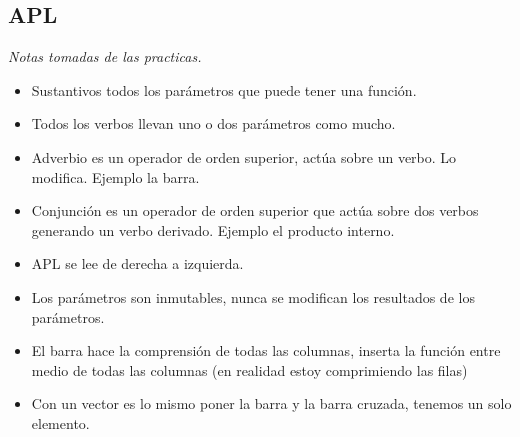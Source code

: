\subsection{APL}
\textit{Notas tomadas de las practicas.}

\begin{itemize}
\item Sustantivos todos los parámetros que puede tener una función.
\item Todos los verbos llevan uno o dos parámetros como mucho.
\item Adverbio es un operador de orden superior, actúa sobre un verbo. Lo modifica. Ejemplo la barra.
\item Conjunción es un operador de orden superior que actúa sobre dos verbos generando un verbo derivado. Ejemplo el producto interno.
\item APL se lee de derecha a izquierda.
\item Los parámetros son inmutables, nunca se modifican los resultados de los parámetros.
\item El barra hace la comprensión de todas las columnas, inserta la función entre medio de todas las columnas (en realidad estoy comprimiendo las filas)
\item Con un vector es lo mismo poner la barra y la barra cruzada, tenemos un solo elemento.
\end{itemize}







